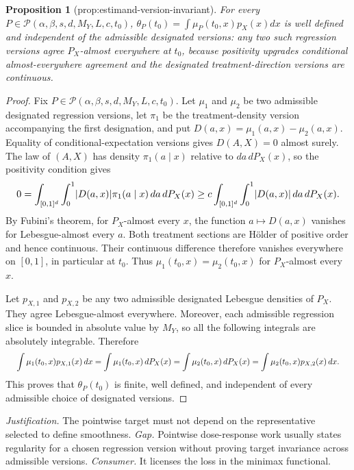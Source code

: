 \documentclass{article}
\newtheorem{proposition}{Proposition}
\begin{document}
\begin{proposition}[prop:estimand-version-invariant]\label{prop:estimand-version-invariant}
For every \(P\in\mathcal P(\alpha,\beta,s,d,M_Y,L,c,t_0)\), \(\theta_P(t_0)=\int\mu_P(t_0,x)p_X(x)dx\) is well defined and independent of the admissible designated versions: any two such regression versions agree \(P_X\)-almost everywhere at \(t_0\), because positivity upgrades conditional almost-everywhere agreement and the designated treatment-direction versions are continuous.
\end{proposition}
\begin{proof}
Fix \(P\in\mathcal P(\alpha,\beta,s,d,M_Y,L,c,t_0)\). Let \(\mu_1\) and \(\mu_2\) be two admissible designated regression versions, let \(\pi_1\) be the treatment-density version accompanying the first designation, and put \(D(a,x)=\mu_1(a,x)-\mu_2(a,x)\). Equality of conditional-expectation versions gives \(D(A,X)=0\) almost surely. The law of \((A,X)\) has density \(\pi_1(a\mid x)\) relative to \(da\,dP_X(x)\), so the positivity condition gives
\[
\makebox[\linewidth][c]{\resizebox{0.98\linewidth}{!}{\(\displaystyle 0=\int_{[0,1]^d}\int_0^1 \lvert D(a,x)\rvert\pi_1(a\mid x)\,da\,dP_X(x)
\ge c\int_{[0,1]^d}\int_0^1 \lvert D(a,x)\rvert\,da\,dP_X(x).\)}}
\]
By Fubini's theorem, for \(P_X\)-almost every \(x\), the function \(a\mapsto D(a,x)\) vanishes for Lebesgue-almost every \(a\). Both treatment sections are H\"older of positive order and hence continuous. Their continuous difference therefore vanishes everywhere on \([0,1]\), in particular at \(t_0\). Thus \(\mu_1(t_0,x)=\mu_2(t_0,x)\) for \(P_X\)-almost every \(x\).

Let \(p_{X,1}\) and \(p_{X,2}\) be any two admissible designated Lebesgue densities of \(P_X\). They agree Lebesgue-almost everywhere. Moreover, each admissible regression slice is bounded in absolute value by \(M_Y\), so all the following integrals are absolutely integrable. Therefore
\[
\makebox[\linewidth][c]{\resizebox{0.98\linewidth}{!}{\(\displaystyle \int\mu_1(t_0,x)p_{X,1}(x)\,dx
=
\int\mu_1(t_0,x)\,dP_X(x)
=
\int\mu_2(t_0,x)\,dP_X(x)
=
\int\mu_2(t_0,x)p_{X,2}(x)\,dx.\)}}
\]
This proves that \(\theta_P(t_0)\) is finite, well defined, and independent of every admissible choice of designated versions.
\end{proof}
\par\smallskip\noindent \textit{Justification.} The pointwise target must not depend on the representative selected to define smoothness. \textit{Gap.} Pointwise dose-response work usually states regularity for a chosen regression version without proving target invariance across admissible versions. \textit{Consumer.} It licenses the loss in the minimax functional.
\end{document}
